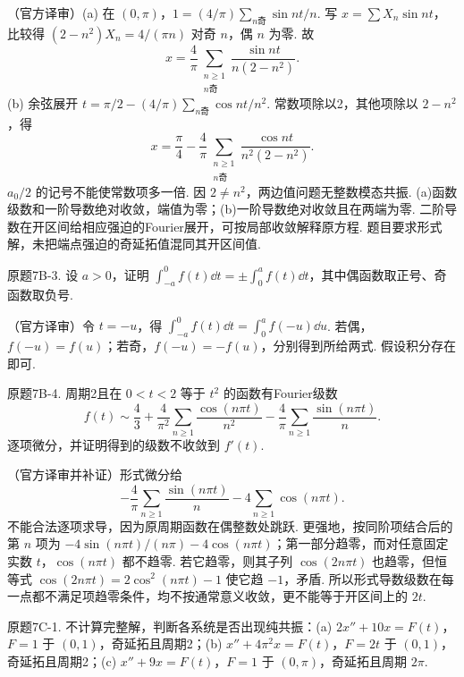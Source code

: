 \begin{solution}（官方译审）(a) 在 $(0,\pi)$，$1=(4/\pi)\sum_{n\text{奇}}\sin nt/n$. 写 $x=\sum X_n\sin nt$，比较得 $(2-n^2)X_n=4/(\pi n)$ 对奇 $n$，偶 $n$ 为零. 故
\[x=\frac4\pi\sum_{\substack{n\ge1\\n\text{奇}}}\frac{\sin nt}{n(2-n^2)}.\]
(b) 余弦展开 $t=\pi/2-(4/\pi)\sum_{n\text{奇}}\cos nt/n^2$. 常数项除以2，其他项除以 $2-n^2$，得
\[x=\frac\pi4-\frac4\pi\sum_{\substack{n\ge1\\n\text{奇}}}\frac{\cos nt}{n^2(2-n^2)}.\]
$a_0/2$ 的记号不能使常数项多一倍. 因 $2\ne n^2$，两边值问题无整数模态共振. (a)函数级数和一阶导数绝对收敛，端值为零；(b)一阶导数绝对收敛且在两端为零. 二阶导数在开区间给相应强迫的Fourier展开，可按局部收敛解释原方程. 题目要求形式解，未把端点强迫的奇延拓值混同其开区间值.\end{solution}
\begin{exercise}\label{cw:bank-7B-3}原题7B-3. 设 $a>0$，证明 $\int_{-a}^0f(t)\dd t=\pm\int_0^af(t)\dd t$，其中偶函数取正号、奇函数取负号.\end{exercise}
\begin{solution}（官方译审）令 $t=-u$，得 $\int_{-a}^0f(t)\dd t=\int_0^af(-u)\dd u$. 若偶，$f(-u)=f(u)$；若奇，$f(-u)=-f(u)$，分别得到所给两式. 假设积分存在即可.\end{solution}
\begin{exercise}\label{cw:bank-7B-4}原题7B-4. 周期2且在 $0<t<2$ 等于 $t^2$ 的函数有Fourier级数
\[f(t)\sim\frac43+\frac4{\pi^2}\sum_{n\ge1}\frac{\cos(n\pi t)}{n^2}-\frac4\pi\sum_{n\ge1}\frac{\sin(n\pi t)}n.\]
逐项微分，并证明得到的级数不收敛到 $f'(t)$.\end{exercise}
\begin{solution}（官方译审并补证）形式微分给
\[-\frac4\pi\sum_{n\ge1}\frac{\sin(n\pi t)}n-4\sum_{n\ge1}\cos(n\pi t).
\]
不能合法逐项求导，因为原周期函数在偶整数处跳跃. 更强地，按同阶项结合后的第 $n$ 项为 $-4\sin(n\pi t)/(n\pi)-4\cos(n\pi t)$；第一部分趋零，而对任意固定实数 $t$，$\cos(n\pi t)$ 都不趋零. 若它趋零，则其子列 $\cos(2n\pi t)$ 也趋零，但恒等式 $\cos(2n\pi t)=2\cos^2(n\pi t)-1$ 使它趋 $-1$，矛盾. 所以形式导数级数在每一点都不满足项趋零条件，均不按通常意义收敛，更不能等于开区间上的 $2t$.\end{solution}
\begin{exercise}\label{cw:bank-7C-1}原题7C-1. 不计算完整解，判断各系统是否出现纯共振：(a) $2x''+10x=F(t)$，$F=1$ 于 $(0,1)$，奇延拓且周期2；(b) $x''+4\pi^2x=F(t)$，$F=2t$ 于 $(0,1)$，奇延拓且周期2；(c) $x''+9x=F(t)$，$F=1$ 于 $(0,\pi)$，奇延拓且周期 $2\pi$.\end{exercise}
